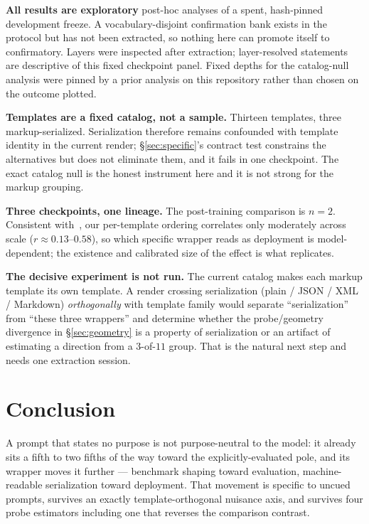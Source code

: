 \documentclass[10pt]{article}
\begin{document}
\textbf{All results are exploratory} post-hoc analyses of a spent, hash-pinned
development freeze. A vocabulary-disjoint confirmation bank exists in the
protocol but has not been extracted, so nothing here can promote itself to
confirmatory. Layers were inspected after extraction; layer-resolved statements
are descriptive of this fixed checkpoint panel. Fixed depths for the
catalog-null analysis were pinned by a prior analysis on this repository rather
than chosen on the outcome plotted.

\textbf{Templates are a fixed catalog, not a sample.} Thirteen templates, three
markup-serialized. Serialization therefore remains confounded with template
identity in the current render; \S\ref{sec:specific}'s contract test constrains
the alternatives but does not eliminate them, and it fails in one checkpoint.
The exact catalog null is the honest instrument here and it is not strong for
the markup grouping.

\textbf{Three checkpoints, one lineage.} The post-training comparison is
$n = 2$. Consistent with~\cite{sclar2024}, our per-template ordering correlates
only moderately across scale ($r \approx 0.13$--$0.58$), so which specific
wrapper reads as deployment is model-dependent; the existence and calibrated
size of the effect is what replicates.

\textbf{The decisive experiment is not run.} The current catalog makes each
markup template its own template. A render crossing serialization (plain / JSON
/ XML / Markdown) \emph{orthogonally} with template family would separate
``serialization'' from ``these three wrappers'' and determine whether the
probe/geometry divergence in \S\ref{sec:geometry} is a property of serialization
or an artifact of estimating a direction from a $3$-of-$11$ group. That is the
natural next step and needs one extraction session.

\section{Conclusion}

A prompt that states no purpose is not purpose-neutral to the model: it already
sits a fifth to two fifths of the way toward the explicitly-evaluated pole, and
its wrapper moves it further --- benchmark shaping toward evaluation,
machine-readable serialization toward deployment. That movement is specific to
uncued prompts, survives an exactly template-orthogonal nuisance axis, and
survives four probe estimators including one that reverses the comparison
contrast.
\end{document}
